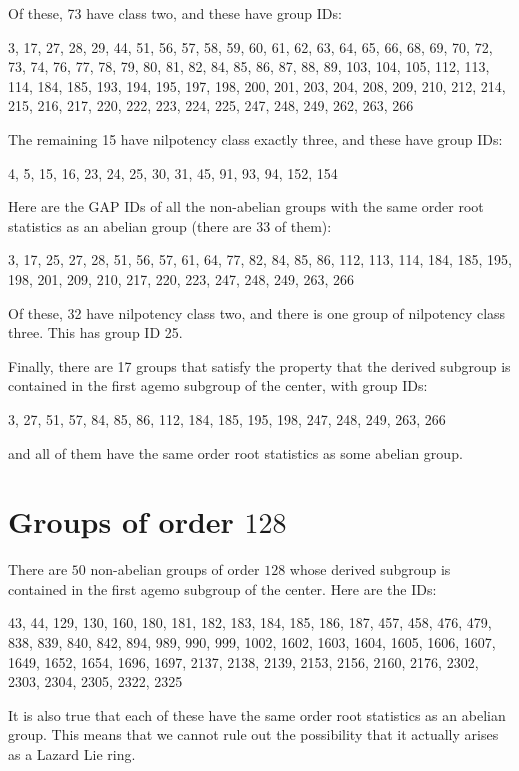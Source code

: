 \documentclass[10pt]{amsart}
\begin{document}
Of these, 73 have class two, and these have group IDs:

3, 17, 27, 28, 29, 44, 51, 56, 57, 58, 59, 60, 61, 62, 63, 64, 65, 66,
68, 69, 70, 72, 73, 74, 76, 77, 78, 79, 80, 81, 82, 84, 85, 86, 87,
88, 89, 103, 104, 105, 112, 113, 114, 184, 185, 193, 194, 195, 197,
198, 200, 201, 203, 204, 208, 209, 210, 212, 214, 215, 216, 217, 220,
222, 223, 224, 225, 247, 248, 249, 262, 263, 266

The remaining 15 have nilpotency class exactly three, and these have group IDs:

4, 5, 15, 16, 23, 24, 25, 30, 31, 45, 91, 93, 94, 152, 154

Here are the GAP IDs of all the non-abelian groups with the same order
root statistics as an abelian group (there are 33 of them):

3, 17, 25, 27, 28, 51, 56, 57, 61, 64, 77, 82, 84, 85, 86, 112, 113,
114, 184, 185, 195, 198, 201, 209, 210, 217, 220, 223, 247, 248, 249,
263, 266

Of these, 32 have nilpotency class two, and there is one group of
nilpotency class three. This has group ID 25.

Finally, there are 17 groups that satisfy the property that the
derived subgroup is contained in the first agemo subgroup of the
center, with group IDs:

3, 27, 51, 57, 84, 85, 86, 112, 184, 185, 195, 198, 247, 248, 249, 263, 266

and all of them have the same order root statistics as some abelian group.

\section{Groups of order $128$}

There are $50$ non-abelian groups of order $128$ whose derived
subgroup is contained in the first agemo subgroup of the center. Here
are the IDs:

43, 44, 129, 130, 160, 180, 181, 182, 183, 184, 185, 186, 187, 457,
458, 476, 479, 838, 839, 840, 842, 894, 989, 990, 999, 1002, 1602,
1603, 1604, 1605, 1606, 1607, 1649, 1652, 1654, 1696, 1697, 2137,
2138, 2139, 2153, 2156, 2160, 2176, 2302, 2303, 2304, 2305, 2322, 2325

It is also true that each of these have the same order root statistics
as an abelian group. This means that we cannot rule out the
possibility that it actually arises as a Lazard Lie ring.
\end{document}
